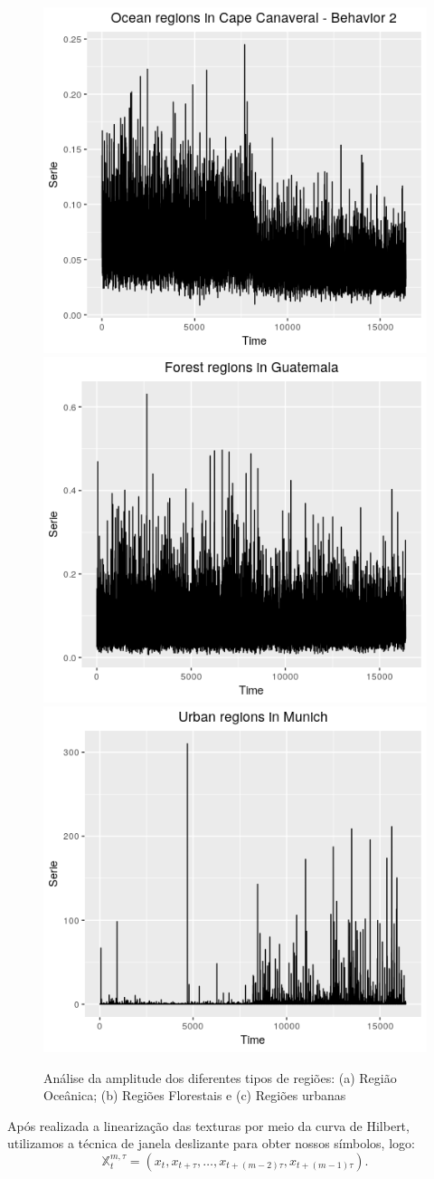 \documentclass[12pt]{article}
\begin{document}
\begin{figure}[hbt]
\centering
\includegraphics[width=.32\linewidth]{Figures/cape2_hilbert.png}
\includegraphics[width=.32\linewidth]{Figures/forestGuatemala_hilbert.png}
\includegraphics[width=.32\linewidth]{Figures/munich_hilbert.png}
\caption{Análise da amplitude dos diferentes tipos de regiões: (a) Região Oceânica; (b) Regiões Florestais e (c) Regiões urbanas}
\label{fig:AmplitudeSAR}
\end{figure}

Após realizada a linearização das texturas por meio da curva de Hilbert, utilizamos a técnica de janela deslizante para obter nossos símbolos, logo:
\begin{equation}
    \mathbb{X}_t^{m,\tau} = (x_{t}, x_{t+\tau},\ldots, x_{t+(m-2)\tau} ,x_{t+(m-1)\tau}).
\end{equation}
\end{document}
